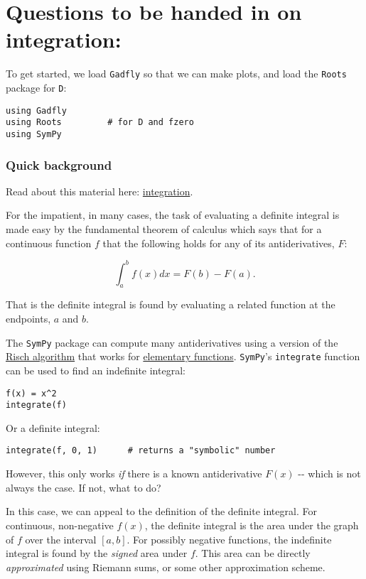 \documentclass[12pt]{article}
\begin{document}
\section{Questions to be handed in on integration:}

To get started, we load \texttt{Gadfly} so that we can make plots, and
load the \texttt{Roots} package for \texttt{D}:



\begin{verbatim}
using Gadfly
using Roots         # for D and fzero
using SymPy
\end{verbatim}
\subsubsection{Quick background}

Read about this material here:
\href{http://mth229.github.io/integration.html}{integration}.

For the impatient, in many cases, the task of evaluating a definite
integral is made easy by the fundamental theorem of calculus which says
that for a continuous function $f$ that the following holds for any of
its antiderivatives, $F$:

\[
\int_a^b f(x) dx = F(b) - F(a).
\]

That is the definite integral is found by evaluating a related function
at the endpoints, $a$ and $b$.

The \texttt{SymPy} package can compute many antiderivatives using a
version of the \href{http://en.wikipedia.org/wiki/Risch_algorithm}{Risch
algorithm} that works for
\href{http://en.wikipedia.org/wiki/Elementary_function}{elementary
functions}. \texttt{SymPy}'s \texttt{integrate} function can be used to
find an indefinite integral:



\begin{verbatim}
f(x) = x^2
integrate(f)
\end{verbatim}
Or a definite integral:



\begin{verbatim}
integrate(f, 0, 1)      # returns a "symbolic" number
\end{verbatim}
However, this only works \emph{if} there is a known antiderivative
$F(x)$ -{}- which is not always the case. If not, what to do?

In this case, we can appeal to the definition of the definite integral.
For continuous, non-negative $f(x)$, the definite integral is the area
under the graph of $f$ over the interval $[a,b]$. For possibly negative
functions, the indefinite integral is found by the \emph{signed} area
under $f$. This area can be directly \emph{approximated} using Riemann
sums, or some other approximation scheme.
\end{document}
